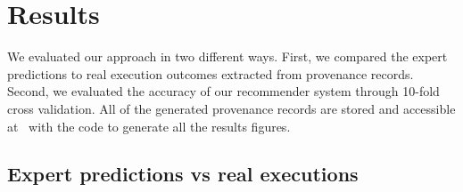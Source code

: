 \documentclass[conference]{IEEEtran}
\begin{document}





\section{Results}

We evaluated our approach in two different ways. First, 
we compared the expert predictions to 
real execution outcomes extracted from provenance records.
Second, we evaluated 
the accuracy of our recommender system through 10-fold cross validation. All of the generated provenance records are stored and accessible at~\cite{provenanceRecords} with the code to generate all the results figures.

\subsection{Expert predictions vs real executions}

\end{document}
